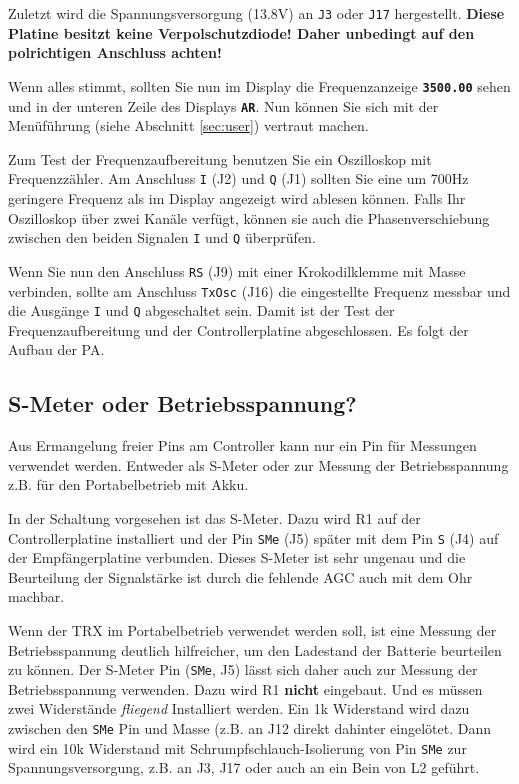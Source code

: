\documentclass[10pt, a4paper]{paper}
\newcommand{\warn}[1]{\textbf{#1}}
\newcommand{\con}[1]{\texttt{#1}}
\newcommand{\dis}[1]{\textbf{\texttt{#1}}}
\begin{document}
Zuletzt wird die Spannungsversorgung (13.8V) an \con{J3} oder \con{J17} hergestellt. \warn{Diese Platine besitzt keine Verpolschutzdiode! Daher unbedingt auf den polrichtigen Anschluss achten!}

Wenn alles stimmt, sollten Sie nun im Display die Frequenzanzeige \dis{3500.00} sehen und in der unteren Zeile des Displays \dis{AR}. Nun können Sie sich mit der Menüführung (siehe Abschnitt \ref{sec:user}) vertraut machen. 

Zum Test der Frequenzaufbereitung benutzen Sie ein Oszilloskop mit Frequenzzähler. Am Anschluss \con{I} (J2) und \con{Q} (J1) sollten Sie eine um 700Hz geringere Frequenz als im Display angezeigt wird ablesen können. Falls Ihr Oszilloskop über zwei Kanäle verfügt, können sie auch die Phasenverschiebung zwischen den beiden Signalen \con{I} und \con{Q} überprüfen. 

Wenn Sie nun den Anschluss \con{RS} (J9) mit einer Krokodilklemme mit Masse verbinden, sollte am Anschluss \con{TxOsc} (J16) die eingestellte Frequenz messbar und die Ausgänge \con{I} und \con{Q} abgeschaltet sein. Damit ist der Test der Frequenzaufbereitung und der Controllerplatine abgeschlossen. Es folgt der Aufbau der PA.

\subsection{S-Meter oder Betriebsspannung?} \label{sec:meter}
Aus Ermangelung freier Pins am Controller kann nur ein Pin für Messungen verwendet werden. Entweder als S-Meter oder zur Messung der Betriebsspannung z.B. für den Portabelbetrieb mit Akku. 

In der Schaltung vorgesehen ist das S-Meter. Dazu wird R1 auf der Controllerplatine installiert und der Pin \con{SMe} (J5) später mit dem Pin \con{S} (J4) auf der Empfängerplatine verbunden. Dieses S-Meter ist sehr ungenau und die Beurteilung der Signalstärke ist durch die fehlende AGC auch mit dem Ohr machbar.

Wenn der TRX im Portabelbetrieb verwendet werden soll, ist eine Messung der Betriebsspannung deutlich hilfreicher, um den Ladestand der Batterie beurteilen zu können. Der S-Meter Pin (\con{SMe}, J5) lässt sich daher auch zur Messung der Betriebsspannung verwenden. 
Dazu wird R1 \warn{nicht} eingebaut. Und es müssen zwei Widerstände \emph{fliegend} Installiert werden. Ein 1k Widerstand wird dazu zwischen den \con{SMe} Pin und Masse (z.B. an J12 direkt dahinter eingelötet. Dann wird ein 10k Widerstand mit Schrumpfschlauch-Isolierung von Pin \con{SMe} zur Spannungsversorgung, z.B. an J3, J17 oder auch an ein Bein von L2 geführt. 
\end{document}

